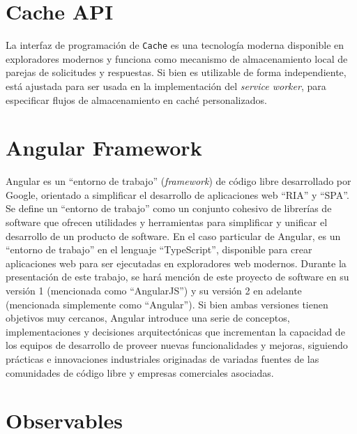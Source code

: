 \section{Cache API}

La interfaz de programación de \texttt{Cache} es una tecnología moderna disponible en exploradores modernos y funciona como mecanismo de almacenamiento local de parejas de solicitudes y respuestas. Si bien es utilizable de forma independiente, está ajustada para ser usada en la implementación del \textit{service worker}, para especificar flujos de almacenamiento en caché personalizados.

\section{Angular Framework}

Angular es un ``entorno de trabajo'' (\textit{framework}) de código libre desarrollado por Google, orientado a simplificar el desarrollo de aplicaciones web ``RIA'' y ``SPA''. Se define un ``entorno de trabajo'' como un conjunto cohesivo de librerías de software que ofrecen utilidades y herramientas para simplificar y unificar el desarrollo de un producto de software. En el caso particular de Angular, es un ``entorno de trabajo'' en el lenguaje ``TypeScript'', disponible para crear aplicaciones web para ser ejecutadas en exploradores web modernos. Durante la presentación de este trabajo, se hará mención de este proyecto de software en su versión 1 (mencionada como ``AngularJS'') y su versión 2 en adelante (mencionada simplemente como ``Angular''). Si bien ambas versiones tienen objetivos muy cercanos, Angular introduce una serie de conceptos, implementaciones y decisiones arquitectónicas que incrementan la capacidad de los equipos de desarrollo de proveer nuevas funcionalidades y mejoras, siguiendo prácticas e innovaciones industriales originadas de variadas fuentes de las comunidades de código libre y empresas comerciales asociadas.

\section{Observables}

